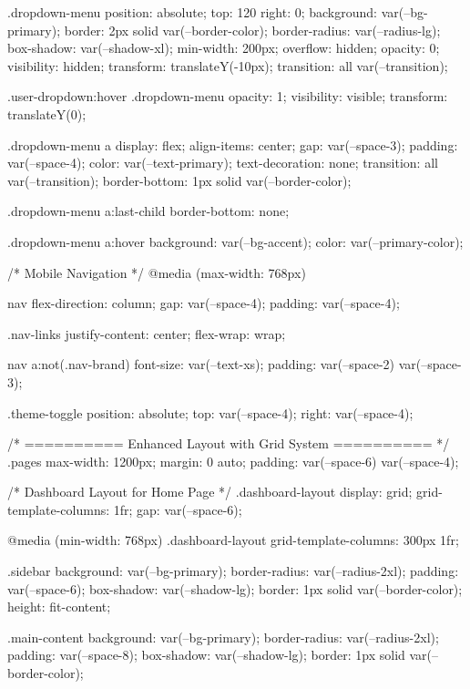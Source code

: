 .dropdown-menu {
  position: absolute;
  top: 120%
  right: 0;
  background: var(--bg-primary);
  border: 2px solid var(--border-color);
  border-radius: var(--radius-lg);
  box-shadow: var(--shadow-xl);
  min-width: 200px;
  overflow: hidden;
  opacity: 0;
  visibility: hidden;
  transform: translateY(-10px);
  transition: all var(--transition);
}

.user-dropdown:hover .dropdown-menu {
  opacity: 1;
  visibility: visible;
  transform: translateY(0);
}

.dropdown-menu a {
  display: flex;
  align-items: center;
  gap: var(--space-3);
  padding: var(--space-4);
  color: var(--text-primary);
  text-decoration: none;
  transition: all var(--transition);
  border-bottom: 1px solid var(--border-color);
}

.dropdown-menu a:last-child {
  border-bottom: none;
}

.dropdown-menu a:hover {
  background: var(--bg-accent);
  color: var(--primary-color);
}

/* Mobile Navigation */
@media (max-width: 768px) {
  nav {
    flex-direction: column;
    gap: var(--space-4);
    padding: var(--space-4);
  }
  
  .nav-links {
    justify-content: center;
    flex-wrap: wrap;
  }
  
  nav a:not(.nav-brand) {
    font-size: var(--text-xs);
    padding: var(--space-2) var(--space-3);
  }
  
  .theme-toggle {
    position: absolute;
    top: var(--space-4);
    right: var(--space-4);
  }
}

/* ========== Enhanced Layout with Grid System ========== */
.pages {
  max-width: 1200px;
  margin: 0 auto;
  padding: var(--space-6) var(--space-4);
}

/* Dashboard Layout for Home Page */
.dashboard-layout {
  display: grid;
  grid-template-columns: 1fr;
  gap: var(--space-6);
}

@media (min-width: 768px) {
  .dashboard-layout {
    grid-template-columns: 300px 1fr;
  }
}

.sidebar {
  background: var(--bg-primary);
  border-radius: var(--radius-2xl);
  padding: var(--space-6);
  box-shadow: var(--shadow-lg);
  border: 1px solid var(--border-color);
  height: fit-content;
}

.main-content {
  background: var(--bg-primary);
  border-radius: var(--radius-2xl);
  padding: var(--space-8);
  box-shadow: var(--shadow-lg);
  border: 1px solid var(--border-color);
}

